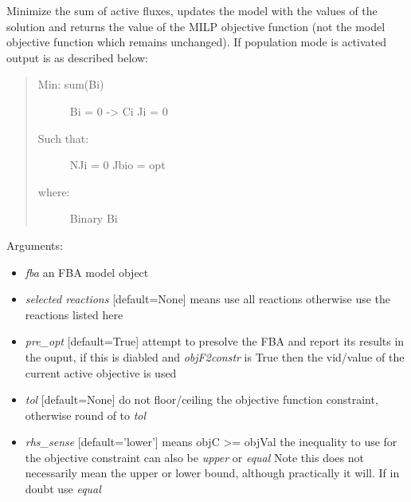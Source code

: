 \documentclass[a4paper,11pt,english]{sphinxmanual}
\begin{document}

\begin{fulllineitems}
\label{modules_doc:cbmpy.CBCPLEX.cplx_MinimizeNumActiveFluxes}
Minimize the sum of active fluxes, updates the model with the values of the solution and returns the value
of the MILP objective function (not the model objective function which remains unchanged). If population mode is activated
output is as described below:
\begin{quote}
\begin{description}
\item[{Min: sum(Bi)}] \leavevmode
Bi = 0 -\textgreater{} Ci Ji = 0

\item[{Such that:}] \leavevmode
NJi = 0
Jbio = opt

\item[{where:}] \leavevmode
Binary Bi

\end{description}
\end{quote}

Arguments:
\begin{itemize}
\item {} 
\emph{fba} an FBA model object

\item {} 
\emph{selected reactions} {[}default=None{]} means use all reactions otherwise use the reactions listed here

\item {} 
\emph{pre\_opt} {[}default=True{]} attempt to presolve the FBA and report its results in the ouput, if this is diabled and \emph{objF2constr} is True then the vid/value of the current active objective is used

\item {} 
\emph{tol}  {[}default=None{]} do not floor/ceiling the objective function constraint, otherwise round of to \emph{tol}

\item {} 
\emph{rhs\_sense} {[}default='lower'{]} means objC \textgreater{}= objVal the inequality to use for the objective constraint can also be \emph{upper} or \emph{equal}
Note this does not necessarily mean the upper or lower bound, although practically it will. If in doubt use \emph{equal}


\end{itemize}
\end{fulllineitems}
\end{document}
